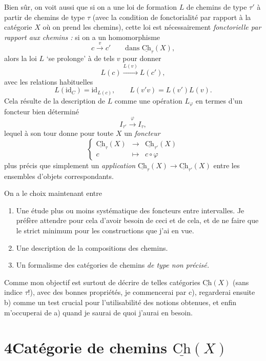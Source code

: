 \documentclass[11pt]{article}
\newcommand{\printedpage}[1]{\marginpar{\footnotesize p.~#1}}
\newcommand{\msp}[1]{\marginpar{\footnotesize [#1]}}
\newcommand{\Ch}{\underline{\mathrm{Ch}}}
\newcommand{\uCh}{\underline{\mathrm{Ch}}}
\begin{document}
Bien sûr, on voit aussi que si on a une loi de formation $L$ de chemins de type $\tau'$ à partir de chemins de type $\tau$ (avec la condition de fonctorialité par rapport à la catégorie $X$ où on prend les chemins), cette loi est nécessairement \textit{fonctorielle par rapport aux chemins :} si on a un homomorphisme
\[
c \xrightarrow{v} c' \qquad \text{dans } \uCh_\tau(X),
\]
\printedpage{15}
alors la loi $L$ ‘se prolonge’ à de tels $v$ pour donner
\[
L(c) \xrightarrow{L(v)} L(c'),
\]
avec les relations habituelles
\[
L(\mathrm{id}_C)=\mathrm{id}_{L(c)}, \qquad L(v'v)=L(v')L(v). %
\]
Cela résulte de la description de $L$ comme une opération $L_\varphi$ en termes d'un foncteur bien déterminé
\[
I_{\tau'} \xrightarrow{\varphi} I_\tau,
\]
lequel à son tour donne pour toute $X$ un \textit{foncteur}
\[
\left\{
\begin{array}{rcl}
\uCh_\tau(X) & \longrightarrow & \uCh_{\tau'}(X)\\[1ex]
c & \longmapsto & c\circ\varphi
\end{array}
\right.
\]
plus précis que simplement un \textit{application} $\Ch_\tau(X)\longrightarrow\Ch_{\tau'}(X)$ entre les ensembles d'objets correspondants. %

\msp{page 24}
On a le choix maintenant entre

\begin{enumerate}[label=\alph*)]
\item Une étude plus ou moins systématique des foncteurs entre intervalles. Je préfère attendre pour cela d'avoir besoin de ceci et de cela, et de ne faire que le strict minimum pour les constructions que j'ai en vue.
\item Une description de la compositions des chemins. %
\item Un formalisme des catégories de chemins \textit{de type non précisé.}
\end{enumerate}

Comme mon objectif est surtout de décrire de telles catégories $\uCh(X)$ (sans indice $\tau$!), avec des bonnes propriétés, je commencerai par c), regarderai ensuite b) comme un test crucial pour l'utilisabilité des notions obtenues, et enfin m'occuperai de a) quand je saurai de quoi j'aurai en besoin.

\printedpage{16}

\section*{4\quad Catégorie de chemins $\uCh(X)$}
\end{document}
